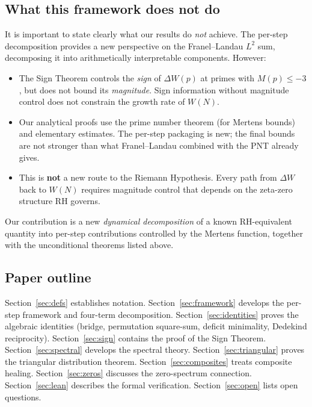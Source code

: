 \documentclass[11pt]{article}
\theoremstyle{definition}
\begin{document}
\subsection{What this framework does not do}\label{sec:intro-honest}

It is important to state clearly what our results do \emph{not} achieve.
The per-step decomposition provides a new perspective on the Franel--Landau
$L^2$ sum, decomposing it into arithmetically interpretable components.
However:

\begin{itemize}
  \item The Sign Theorem controls the \emph{sign} of $\Delta W(p)$ at primes
    with $M(p) \le -3$, but does not bound its \emph{magnitude}.  Sign
    information without magnitude control does not constrain the growth
    rate of $W(N)$.
  \item Our analytical proofs use the prime number theorem
    (for Mertens bounds) and elementary estimates.  The per-step packaging
    is new; the final bounds are not stronger than what Franel--Landau
    combined with the PNT already gives.
  \item This is \textbf{not} a new route to the Riemann Hypothesis.
    Every path from $\Delta W$ back to $W(N)$ requires magnitude control
    that depends on the zeta-zero structure RH governs.
\end{itemize}

Our contribution is a new \emph{dynamical decomposition} of a known
RH-equivalent quantity into per-step contributions controlled by the
Mertens function, together with the unconditional theorems listed above.

\subsection{Paper outline}\label{sec:intro-outline}

Section~\ref{sec:defs} establishes notation.
Section~\ref{sec:framework} develops the per-step framework and four-term
decomposition.  Section~\ref{sec:identities} proves the algebraic
identities (bridge, permutation square-sum, deficit minimality, Dedekind
reciprocity).  Section~\ref{sec:sign} contains the proof of the Sign
Theorem.  Section~\ref{sec:spectral} develops the spectral theory.
Section~\ref{sec:triangular} proves the triangular distribution theorem.
Section~\ref{sec:composites} treats composite healing.
Section~\ref{sec:zeros} discusses the zero-spectrum connection.
Section~\ref{sec:lean} describes the formal verification.
Section~\ref{sec:open} lists open questions.
\end{document}
